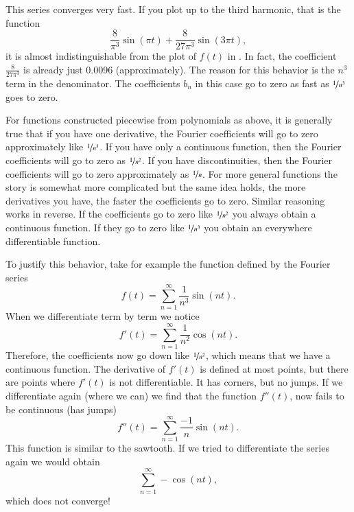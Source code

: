 \begin{example}
This series converges very fast.
If you plot up
to the third harmonic, that is the function
\begin{equation*}
\frac{8}{\pi^3} \sin (\pi t) + 
\frac{8}{27 \pi^3} \sin (3 \pi t) ,
\end{equation*}
it is almost indistinguishable from the plot of $f(t)$ in
.
In fact, the coefficient 
$\frac{8}{27 \pi^3}$ is already just 0.0096 (approximately).
The reason for this behavior is the $n^3$ term in the denominator.
The coefficients $b_n$ in this case go to zero as fast as
$\nicefrac{1}{n^3}$ goes to
zero.
\end{example}

For functions constructed piecewise from polynomials as above,
it is generally true that
if you have one derivative, the Fourier
coefficients will go to zero approximately like $\nicefrac{1}{n^3}$.  If you
have only a continuous function, then the Fourier coefficients will go to
zero as $\nicefrac{1}{n^2}$.  If you have discontinuities, then 
the Fourier coefficients will go to zero approximately as $\nicefrac{1}{n}$.
For more general functions the story is somewhat more complicated but the
same idea holds, the more derivatives you have, the faster the coefficients
go to zero.  Similar reasoning works in reverse.  If the coefficients go to
zero like $\nicefrac{1}{n^2}$ you always obtain a continuous function.  If
they go to zero like $\nicefrac{1}{n^3}$ you obtain an everywhere differentiable
function.

To justify this behavior, take for example the function defined by
the Fourier series
\begin{equation*}
f(t) = \sum_{n=1}^\infty \frac{1}{n^3} \sin (n t) .
\end{equation*}
When we differentiate term by term we notice
\begin{equation*}
f'(t) = \sum_{n=1}^\infty \frac{1}{n^2} \cos (n t) .
\end{equation*}
Therefore, the coefficients now go down like $\nicefrac{1}{n^2}$, which 
means that we have a continuous function.
The derivative 
of $f'(t)$ is defined
at most points, but there are points where $f'(t)$ is not differentiable.
It has corners, but no jumps.
If we
differentiate again (where we can) we find that the function
$f''(t)$,
now fails to be continuous (has jumps)
\begin{equation*}
f''(t) = \sum_{n=1}^\infty \frac{-1}{n} \sin (n t) .
\end{equation*}
This function is similar to the sawtooth.  If we tried to differentiate
the series again we would obtain
\begin{equation*}
\sum_{n=1}^\infty -\cos (n t) ,
\end{equation*}
which does not converge!

